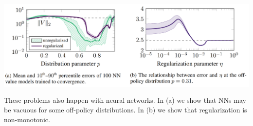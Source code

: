 \begin{center}
    \includegraphics[scale=0.4]{parts/nn/nn2.png}
\end{center}
\vspace{-.11in}
These problems also happen with neural networks.
In (a) we show that NNs may be vacuous for some off-policy distributions. In (b) we show that regularization is non-monotonic.
\vspace{-.2in}
